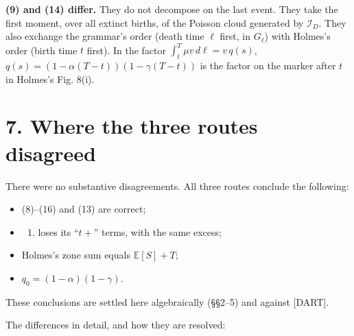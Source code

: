 \documentclass[10pt,]{article}
\providecommand{\tightlist}{%
  \setlength{\itemsep}{0pt}\setlength{\parskip}{0pt}}
\begin{document}
\textbf{(9) and (14) differ.} They do not decompose on the last event.
They take the first moment, over all extinct births, of the Poisson
cloud generated by \(\mathcal I_D\). They also exchange the grammar's
order (death time \(\ell\) first, in \(G_\ell\)) with Holmes's order
(birth time \(t\) first). In the factor
\(\int_t^T\mu v\,d\ell=v\,q(s)\),
\(q(s)=(1-\alpha(T-t))(1-\gamma(T-t))\) is the factor on the marker
after \(t\) in Holmes's Fig. 8(i).

\hypertarget{where-the-three-routes-disagreed}{%
\section{7. Where the three routes
disagreed}\label{where-the-three-routes-disagreed}}

There were no substantive disagreements. All three routes conclude the
following:

\begin{itemize}
\item
  (8)--(16) and (13) are correct;
\item
  \begin{enumerate}
  \def\labelenumi{(\arabic{enumi})}
  \setcounter{enumi}{16}
  \tightlist
  \item
    loses its ``\(t+\)'' terms, with the same excess;
  \end{enumerate}
\item
  Holmes's zone sum equals \(\mathbb E[S]+T\);
\item
  \(q_0=(1-\alpha)(1-\gamma)\).
\end{itemize}

These conclusions are settled here algebraically (§§2--5) and against
{[}DART{]}.

The differences in detail, and how they are resolved:
\end{document}
